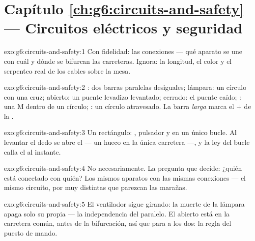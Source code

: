\section*{Capítulo \ref{ch:g6:circuits-and-safety} --- Circuitos eléctricos y seguridad}

\begin{solution}{exo:g6:circuits-and-safety:1}
Con fidelidad: las conexiones --- qué aparato se une con cuál y dónde
se bifurcan las carreteras. Ignora: la longitud, el color y el
serpenteo real de los cables sobre la mesa.
\end{solution}

\begin{solution}{exo:g6:circuits-and-safety:2}
: dos barras paralelas desiguales; lámpara: un círculo con una
cruz;  abierto: un puente levadizo levantado;
 cerrado: el puente caído; : una M dentro de
un círculo; : un círculo atravesado. La barra \emph{larga}
marca el $+$ de la .
\end{solution}

\begin{solution}{exo:g6:circuits-and-safety:3}
Un rectángulo: , pulsador y  en un único
bucle. Al levantar el dedo se abre el  --- un hueco en
la única carretera ---, y la ley del bucle calla el  al
instante.
\end{solution}

\begin{solution}{exo:g6:circuits-and-safety:4}
No necesariamente. La pregunta que decide: ¿quién está conectado con
quién? Los mismos aparatos con las mismas conexiones --- el mismo
circuito, por muy distintas que parezcan las marañas.
\end{solution}

\begin{solution}{exo:g6:circuits-and-safety:5}
El ventilador sigue girando: la muerte de la lámpara apaga solo su
propia  --- la independencia del paralelo. El
 abierto está en la carretera común, antes de la
bifurcación, así que para a los dos: la regla del puesto de mando.
\end{solution}

